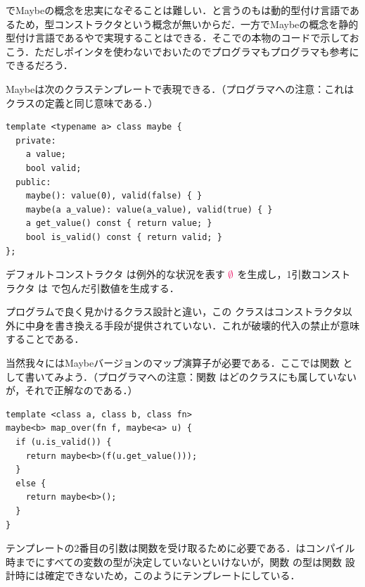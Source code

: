 \documentclass[a5paper,twoside,fleqn,draft]{jsbook}
\begin{document}
\python でMaybeの概念を忠実になぞることは難しい．と言うのも\python は動的型付け言語であるため，型コンストラクタという概念が無いからだ．一方でMaybeの概念を静的型付け言語である\cxx や\java で実現することはできる．そこで\cxx の本物のコードで示しておこう．ただしポインタを使わないでおいたので\cxx プログラマも\java プログラマも参考にできるだろう．

Maybeは次のクラステンプレートで表現できる．（\java プログラマへの注意：これはクラスの定義と同じ意味である．）
\begin{cxxcode}
\begin{verbatim}
template <typename a> class maybe {
  private:
    a value;
    bool valid;
  public:
    maybe(): value(0), valid(false) { }
    maybe(a a_value): value(a_value), valid(true) { }
    a get_value() const { return value; }
    bool is_valid() const { return valid; }
};
\end{verbatim}
\end{cxxcode}
デフォルトコンストラクタ  は例外的な状況を表す $\hNothing$ を生成し，1引数コンストラクタ  は  で包んだ引数値を生成する．

\cxx プログラムで良く見かけるクラス設計と違い，この  クラスはコンストラクタ以外に中身を書き換える手段が提供されていない．これが破壊的代入の禁止が意味することである．

当然我々にはMaybeバージョンのマップ演算子が必要である．ここでは関数  として書いてみよう．（\java プログラマへの注意：関数  はどのクラスにも属していないが，それで正解なのである．）
\begin{cxxcode}
\begin{verbatim}
template <class a, class b, class fn>
maybe<b> map_over(fn f, maybe<a> u) {
  if (u.is_valid()) {
    return maybe<b>(f(u.get_value()));
  }
  else {
    return maybe<b>();
  }
}
\end{verbatim}
\end{cxxcode}
テンプレートの2番目の引数は関数を受け取るために必要である．\cxx はコンパイル時までにすべての変数の型が決定していないといけないが，関数  の型は関数  設計時には確定できないため，このようにテンプレートにしている．
\end{document}
